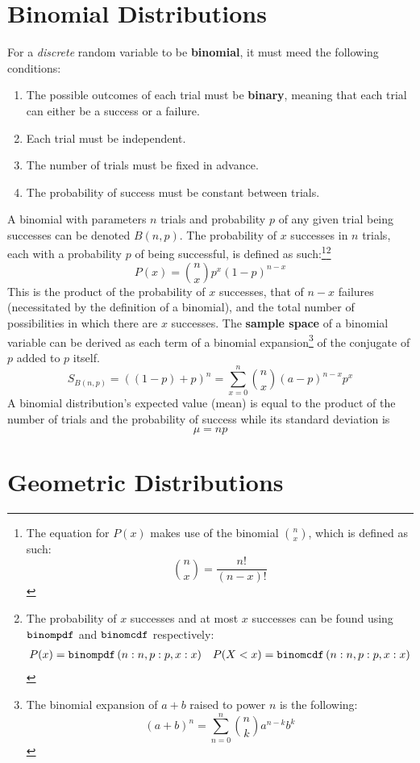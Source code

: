 \documentclass[../AP_Statistics.tex]{subfiles}
\begin{document}
		\section{Binomial Distributions}
			For a \emph{discrete} random variable to be \textbf{binomial}, it must meed the following conditions:
			\begin{enumerate}
				\item
					The possible outcomes of each trial must be \textbf{binary}, meaning that each trial can either be a success or a failure.
				\item
					Each trial must be independent.
				\item
					The number of trials must be fixed in advance.
				\item
					The probability of success must be constant between trials.
			\end{enumerate}
			A binomial with parameters $n$ trials and probability $p$ of any given trial being successes can be denoted $B(n, p)$.
			The probability of $x$ successes in $n$ trials, each with a probability $p$ of being successful, is defined as such:\footnote{The equation for $P(x)$ makes use of the binomial $\binom{n}{x}$, which is defined as such:\[\binom{n}{x} = \frac{n!}{(n - x)!}\]}\footnote{The probability of $x$ successes and at most $x$ successes can be found using $\operatorname{\texttt{binompdf}}$ and $\operatorname{\texttt{binomcdf}}$ respectively:\begin{align*}P(x) = \operatorname{\texttt{binompdf}}\left(n:n, p:p, x:x\right) && P(X < x) = \operatorname{\texttt{binomcdf}}\left(n:n, p:p, x:x\right)\end{align*}}
			\[P(x) = \binom{n}{x}p^x(1 - p)^{n - x}\]
			This is the product of the probability of $x$ successes, that of $n - x$ failures (necessitated by the definition of a binomial), and the total number of possibilities in which there are $x$ successes.
			The \textbf{sample space} of a binomial variable can be derived as each term of a binomial expansion\footnote{The binomial expansion of $a + b$ raised to power $n$ is the following:\[(a + b)^n = \sum_{n = 0}^n\binom{n}{k}a^{n - k}b^k\]} of the conjugate of $p$ added to $p$ itself.
			\[S_{B(n, p)} = ((1 - p) + p)^n = \sum_{x = 0}^n\binom{n}{x}(a - p)^{n - x}p^x\]
			A binomial distribution's expected value (mean) is equal to the product of the number of trials and the probability of success while its standard deviation is 
			\[\mu = np\]
		\section{Geometric Distributions}
\end{document}
